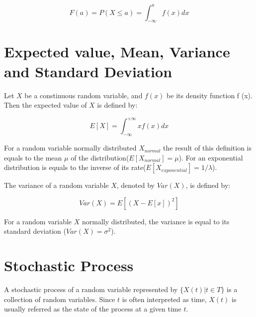 \begin{equation}
F(a) = P(X \leq a) = \int_{- \infty}^{a}f(x) dx 
\end{equation}


\section{Expected value, Mean, Variance and Standard Deviation}

Let $X$ be a constinuous random variable, and $f(x)$ be its  density function f (x). Then the expected value of $X$ is defined by:

\begin{equation}
E[X] =  \int_{- \infty}^{+ \infty}xf(x) dx 
\end{equation}

For a random variable normally distributed $X_{normal}$ the result of this definition is equals to the mean $\mu$ of the distribution($E[X_{normal}] = \mu$). For an exponential distribution is equals to the inverse of its rate($E[X_{exponential}] = 1/\lambda$).

The variance of a random variable $X$, denoted by $Var(X)$, is defined by:

\begin{equation}
Var(X) =  E[( X - E[x])^{2}] 
\end{equation}

For a random variable $X$ normally distributed, the variance is equal to its standard deviation ($Var(X) = \sigma^{2}$)\cite{ross-probability}. 


\section{Stochastic Process}

A stochastic process of a random variable represented by $\{X(t)| t \in T\}$ is a collection of random variables. Since $t$ is often interpreted as time, $X (t) $ is usually referred as the state of the process at a given time $t$\cite{ross-probability}.


